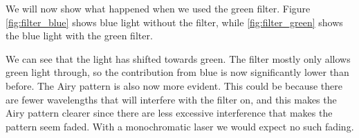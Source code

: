 

We will now show what happened when we used the green filter. Figure \vref{fig:filter_blue} shows blue light without the filter, while \vref{fig:filter_green} shows the blue light with the green filter.

We can see that the light has shifted towards green. The filter mostly only allows green light through, so the contribution from blue is now significantly lower than before. The Airy pattern is also now more evident. This could be because there are fewer wavelengths that will interfere with the filter on, and this makes the Airy pattern clearer since there are less excessive interference that makes the pattern seem faded. With a monochromatic laser we would expect no such fading.